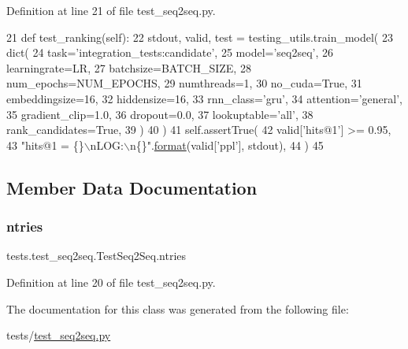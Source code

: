 Definition at line 21 of file test\+\_\+seq2seq.\+py.


\begin{DoxyCode}
21     \textcolor{keyword}{def }test\_ranking(self):
22         stdout, valid, test = testing\_utils.train\_model(
23             dict(
24                 task=\textcolor{stringliteral}{'integration\_tests:candidate'},
25                 model=\textcolor{stringliteral}{'seq2seq'},
26                 learningrate=LR,
27                 batchsize=BATCH\_SIZE,
28                 num\_epochs=NUM\_EPOCHS,
29                 numthreads=1,
30                 no\_cuda=\textcolor{keyword}{True},
31                 embeddingsize=16,
32                 hiddensize=16,
33                 rnn\_class=\textcolor{stringliteral}{'gru'},
34                 attention=\textcolor{stringliteral}{'general'},
35                 gradient\_clip=1.0,
36                 dropout=0.0,
37                 lookuptable=\textcolor{stringliteral}{'all'},
38                 rank\_candidates=\textcolor{keyword}{True},
39             )
40         )
41         self.assertTrue(
42             valid[\textcolor{stringliteral}{'hits@1'}] >= 0.95,
43             \textcolor{stringliteral}{"hits@1 = \{\}\(\backslash\)nLOG:\(\backslash\)n\{\}"}.\hyperlink{namespaceparlai_1_1chat__service_1_1services_1_1messenger_1_1shared__utils_a32e2e2022b824fbaf80c747160b52a76}{format}(valid[\textcolor{stringliteral}{'ppl'}], stdout),
44         )
45 
\end{DoxyCode}


\subsection{Member Data Documentation}
\mbox{\label{classtests_1_1test__seq2seq_1_1TestSeq2Seq_a5681e61335c043954e727fa9eb4b1eb3}} 
\subsubsection{\texorpdfstring{ntries}{ntries}}
{\footnotesize\ttfamily tests.\+test\+\_\+seq2seq.\+Test\+Seq2\+Seq.\+ntries\hspace{0.3cm}{\ttfamily [static]}}



Definition at line 20 of file test\+\_\+seq2seq.\+py.



The documentation for this class was generated from the following file\+:\begin{DoxyCompactItemize}
\item 
tests/\hyperlink{test__seq2seq_8py}{test\+\_\+seq2seq.\+py}\end{DoxyCompactItemize}
